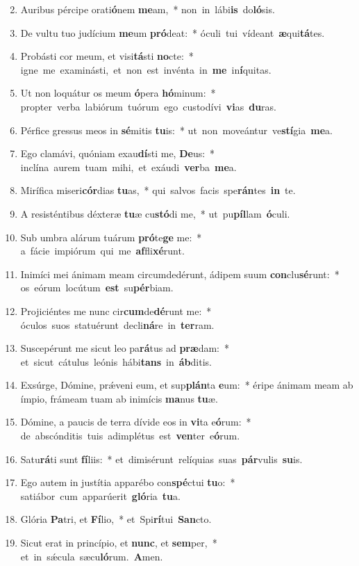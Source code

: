 \begin{flushleft}
\begin{enumerate}[leftmargin=*]
\setcounter{enumi}{1}

\item Auribus pércipe orati\textbf{ó}nem \textbf{me}am,~* \mbox{non in lábi\textbf{is} do\textbf{ló}sis.}
\item De vultu tuo judícium \textbf{me}um \textbf{pró}deat:~* \mbox{óculi tui vídeant \textbf{æ}qui\textbf{tá}tes.}
\item Probásti cor meum, et visi\textbf{tá}sti \textbf{no}cte:~* \mbox{igne me examinásti, et non est invénta in \textbf{me} in\textbf{í}quitas.}
\item Ut non loquátur os meum \textbf{ó}pera \textbf{hó}minum:~* \mbox{propter verba labiórum tuórum ego custodívi \textbf{vi}as \textbf{du}ras.}
\item Pérfice gressus meos in \textbf{sé}mitis \textbf{tu}is:~* \mbox{ut non moveántur ve\textbf{stí}gia \textbf{me}a.}
\item Ego clamávi, quóniam exau\textbf{dí}sti me, \textbf{De}us:~* \mbox{inclína aurem tuam mihi, et exáudi \textbf{ver}ba \textbf{me}a.}
\item Mirífica miseri\textbf{cór}dias \textbf{tu}as,~* \mbox{qui salvos facis spe\textbf{rán}tes \textbf{in} te.}
\item A resisténtibus déxteræ \textbf{tu}æ cu\textbf{stó}di me,~* \mbox{ut pu\textbf{píl}lam \textbf{ó}culi.}
\item Sub umbra alárum tuárum \textbf{pró}te\textbf{ge} me:~* \mbox{a fácie impiórum qui me \textbf{af}fli\textbf{xé}runt.}
\item Inimíci mei ánimam meam circumdedérunt, ádipem suum \textbf{con}clu\textbf{sé}runt:~* \mbox{os eórum locútum \textbf{est} su\textbf{pér}biam.}
\item Projiciéntes me nunc cir\textbf{cum}de\textbf{dé}runt me:~* \mbox{óculos suos statuérunt decli\textbf{ná}re in \textbf{ter}ram.}
\item Suscepérunt me sicut leo pa\textbf{rá}tus ad \textbf{præ}dam:~* \mbox{et sicut cátulus leónis hábi\textbf{tans} in \textbf{áb}ditis.}
\item Exsúrge, Dómine, pr\'{\ae}veni eum, et sup\textbf{plán}ta \textbf{e}um:~* éripe ánimam meam ab ímpio, frámeam tuam ab inimícis \textbf{ma}nus \textbf{tu}æ.
\item Dómine, a paucis de terra dívide eos in \textbf{vi}ta e\textbf{ó}rum:~* \mbox{de abscónditis tuis adimplétus est \textbf{ven}ter e\textbf{ó}rum.}
\item Satu\textbf{rá}ti sunt \textbf{fí}liis:~* \mbox{et dimisérunt relíquias suas \textbf{pár}vulis \textbf{su}is.}
\item Ego autem in justítia apparébo con\textbf{spé}ctui \textbf{tu}o:~* \mbox{satiábor cum apparúerit \textbf{gló}ria \textbf{tu}a.}
\item Glória \textbf{Pa}tri, et \textbf{Fí}lio,~* \mbox{et Spi\textbf{rí}tui \textbf{San}cto.}
\item Sicut erat in princípio, et \textbf{nunc}, et \textbf{sem}per,~* \mbox{et in s\'{\ae}cula sæcu\textbf{ló}rum. \textbf{A}men.}

\end{enumerate}
\end{flushleft}

